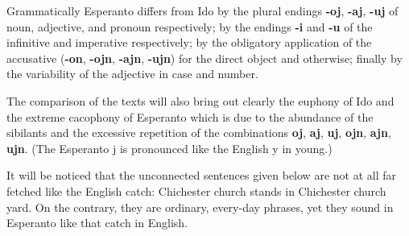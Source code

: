Grammatically Esperanto differs from Ido by the plural endings \textbf{-oj}, \textbf{-aj}, \textbf{-uj} of noun, adjective, and pronoun respectively; by the endings \textbf{-i} and \textbf{-u} of the infinitive and imperative respectively; by the obligatory application of the accusative (\textbf{-on}, \textbf{-ojn}, \textbf{-ajn}, \textbf{-ujn}) for the direct object and otherwise; finally by the variability of the adjective in case and number. 

The comparison of the texts will also bring out clearly the euphony of Ido and the extreme cacophony of Esperanto which is due to the abundance of the sibilants and the excessive repetition of the combinations \textbf{oj}, \textbf{aj}, \textbf{uj}, \textbf{ojn}, \textbf{ajn}, \textbf{ujn}. (The Esperanto j is pronounced like the English y in young.) 

It will be noticed that the unconnected sentences given below are not at all far fetched like the English catch: Chichester church stands in Chichester church yard. On the contrary, they are ordinary, every-day phrases, yet they sound in Esperanto like that catch in English.

